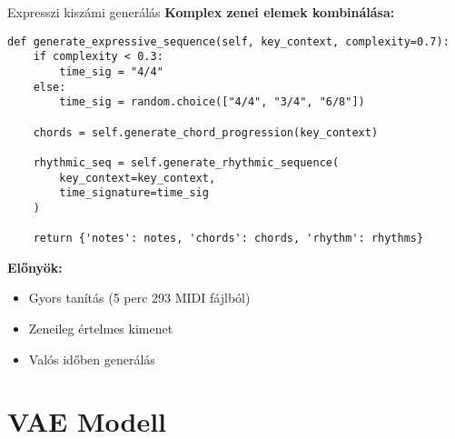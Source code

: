 \documentclass[aspectratio=169]{beamer}
\begin{document}
\begin{frame}[fragile]{Expresszi kiszámi generálás}
\textbf{Komplex zenei elemek kombinálása:}

\begin{lstlisting}
def generate_expressive_sequence(self, key_context, complexity=0.7):
    if complexity < 0.3:
        time_sig = "4/4"
    else:
        time_sig = random.choice(["4/4", "3/4", "6/8"])
    
    chords = self.generate_chord_progression(key_context)
    
    rhythmic_seq = self.generate_rhythmic_sequence(
        key_context=key_context,
        time_signature=time_sig
    )
    
    return {'notes': notes, 'chords': chords, 'rhythm': rhythms}
\end{lstlisting}

\textbf{Előnyök:}
\begin{itemize}
    \item Gyors tanítás (5 perc 293 MIDI fájlból)
    \item Zeneileg értelmes kimenet
    \item Valós időben generálás
\end{itemize}
\end{frame}

\section{VAE Modell}
\end{document}
